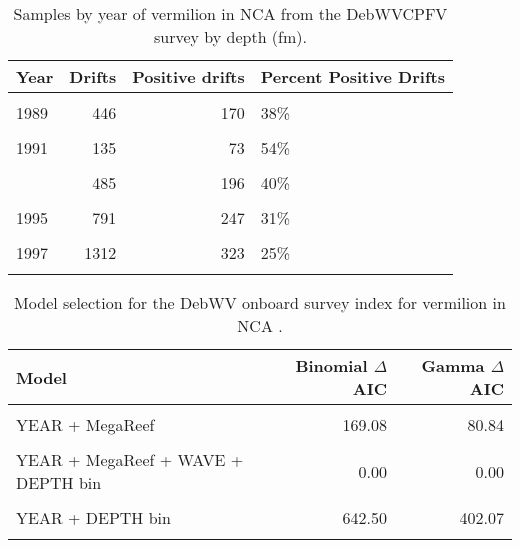 \documentclass[11pt,
  english,
  a4paper,
]{article}
\begin{document}
\begin{table}

\caption{\label{tab:tab-year-debwv}Samples by year of vermilion in NCA from the  DebWVCPFV survey by depth (fm).}
\centering
\begin{tabular}[t]{lrrl}
\toprule
Year & Drifts & Positive drifts & Percent Positive Drifts\\
\midrule
\cellcolor{gray!6}{1988} & \cellcolor{gray!6}{422} & \cellcolor{gray!6}{136} & \cellcolor{gray!6}{32\%}\\
1989 & 446 & 170 & 38\%\\
\cellcolor{gray!6}{1990} & \cellcolor{gray!6}{122} & \cellcolor{gray!6}{65} & \cellcolor{gray!6}{53\%}\\
1991 & 135 & 73 & 54\%\\
\cellcolor{gray!6}{1992} & \cellcolor{gray!6}{467} & \cellcolor{gray!6}{168} & \cellcolor{gray!6}{36\%}\\
\addlinespace
1993 & 485 & 196 & 40\%\\
\cellcolor{gray!6}{1994} & \cellcolor{gray!6}{555} & \cellcolor{gray!6}{189} & \cellcolor{gray!6}{34\%}\\
1995 & 791 & 247 & 31\%\\
\cellcolor{gray!6}{1996} & \cellcolor{gray!6}{963} & \cellcolor{gray!6}{238} & \cellcolor{gray!6}{25\%}\\
1997 & 1312 & 323 & 25\%\\
\addlinespace
\cellcolor{gray!6}{1998} & \cellcolor{gray!6}{899} & \cellcolor{gray!6}{211} & \cellcolor{gray!6}{23\%}\\
\bottomrule
\end{tabular}
\end{table}

\begin{table}

\caption{\label{tab:tab-model-select-debwv}Model selection for the DebWV onboard survey index for vermilion in NCA .}
\centering
\begin{tabular}[t]{lrr}
\toprule
Model & Binomial $\Delta$AIC & Gamma $\Delta$AIC\\
\midrule
\cellcolor{gray!6}{1} & \cellcolor{gray!6}{1011.38} & \cellcolor{gray!6}{402.07}\\
YEAR + MegaReef & 169.08 & 80.84\\
\cellcolor{gray!6}{YEAR + MegaReef + WAVE} & \cellcolor{gray!6}{120.32} & \cellcolor{gray!6}{57.19}\\
YEAR + MegaReef + WAVE + DEPTH bin & 0.00 & 0.00\\
\cellcolor{gray!6}{YEAR + WAVE + DEPTH bin} & \cellcolor{gray!6}{611.73} & \cellcolor{gray!6}{252.61}\\
\addlinespace
YEAR + DEPTH bin & 642.50 & 402.07\\
\cellcolor{gray!6}{YEAR + MegaReef + DEPTH bin} & \cellcolor{gray!6}{55.30} & \cellcolor{gray!6}{14.94}\\
\bottomrule
\end{tabular}
\end{table}
\end{document}
